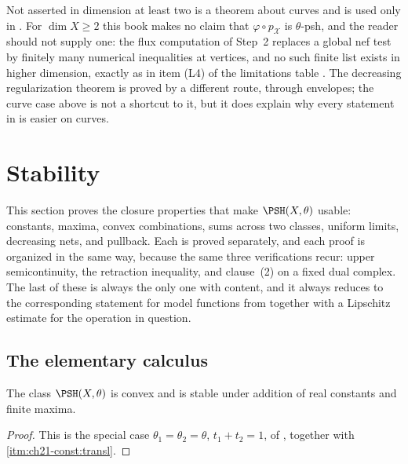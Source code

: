\begin{warning}{Not asserted in dimension at least two}
 is a theorem about curves and is used
only in .  For \(\dim X\geq2\) this book makes no
claim that \(\varphi\circ p_{\mathcal X}\) is \(\theta\)-psh, and the reader
should not supply one: the flux computation of Step~2 replaces a global nef
test by finitely many numerical inequalities at vertices, and no such finite
list exists in higher dimension, exactly as in item (L4) of the limitations
table .  The decreasing regularization
theorem  is proved by a different
route, through envelopes; the curve case above is not a shortcut to it, but
it does explain why every statement in  is easier on curves.
\end{warning}

\section{Stability}
\label{sec:ch21-stability}

This section proves the closure properties that make
\(\PSH(X,\theta)\) usable: constants, maxima, convex combinations, sums
across two classes, uniform limits, decreasing nets, and pullback.  Each is
proved separately, and each proof is organized in the same way, because the
same three verifications recur: upper semicontinuity, the retraction
inequality, and clause~(2) on a fixed dual complex.  The last of these is
always the only one with content, and it always reduces to the corresponding
statement for model functions from  together with
a Lipschitz estimate for the operation in question.

\subsection{The elementary calculus}
\label{sec:ch21-elementary-calculus}

\begin{proposition}\label{prop:ch21-elementary-stability}
The class \(\PSH(X,\theta)\) is convex and is stable under addition of real
constants and finite maxima.
\end{proposition}

\begin{proof}
This is the special case \(\theta_1=\theta_2=\theta\),
\(t_1+t_2=1\), of , together with
\,\cref{itm:ch21-const:transl}.
\end{proof}

